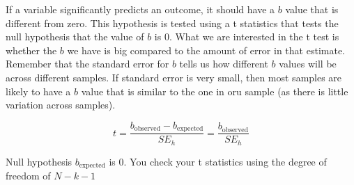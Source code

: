 If a variable significantly predicts an outcome, it should have a $b$ value that is different from zero. This hypothesis is tested using a t statistics that tests the null hypothesis that the value of $b$ is 0. What we are interested in the t test is whether the $b$ we have is big compared to the amount of error in that estimate. Remember that the standard error for $b$ tells us how different $b$ values will be across different samples. If standard error is very small, then most samples are likely to have a $b$ value that is similar to the one in oru sample (as there is little variation across samples). 

\begin{equation}
t = \frac{b_{\text{observed}} - b_{\text{expected}}}{SE_h} = \frac{b_{\text{observed}}}{SE_h} 
\end{equation}

Null hypothesis $b_{\text{expected}}$ is 0. You check your t statistics using the degree of freedom of $N-k-1$
